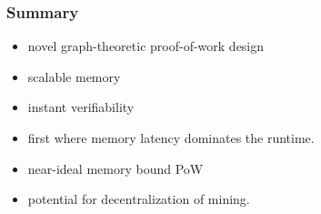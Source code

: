\documentclass{beamer}
\begin{document}
\begin{frame}
\frametitle{Summary}
\begin{itemize}
\item
novel graph-theoretic proof-of-work design
\item scalable memory
\item instant verifiability
\item first where memory latency dominates the runtime.
\item near-ideal memory bound PoW
\item potential for decentralization of mining.
\end{itemize}
\end{frame}
\end{document}
